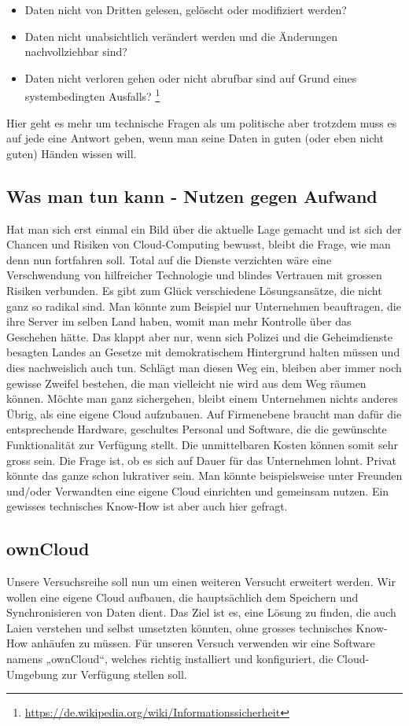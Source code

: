 \begin{itemize}
\item Daten nicht von Dritten gelesen, gelöscht oder modifiziert werden?
\item Daten nicht unabsichtlich verändert werden und die Änderungen nachvollziehbar sind?
\item Daten nicht verloren gehen oder nicht abrufbar sind auf Grund eines systembedingten Ausfalls?
\footnote{\url{https://de.wikipedia.org/wiki/Informationssicherheit}}
\end{itemize}

Hier geht es mehr um technische Fragen als um politische aber trotzdem muss es auf jede eine Antwort geben, wenn man seine Daten in guten (oder eben nicht guten) Händen wissen will.

\subsection{Was man tun kann - Nutzen gegen Aufwand}
Hat man sich erst einmal ein Bild über die aktuelle Lage gemacht und ist sich der Chancen und Risiken von Cloud-Computing bewusst, bleibt die Frage, wie man denn nun fortfahren soll. Total auf die Dienste verzichten wäre eine Verschwendung von hilfreicher Technologie und blindes Vertrauen mit grossen Risiken verbunden. Es gibt zum Glück verschiedene Lösungsansätze, die nicht ganz so radikal sind. Man könnte zum Beispiel nur Unternehmen beauftragen, die ihre Server im selben Land haben, womit man mehr Kontrolle über das Geschehen hätte. Das klappt aber nur, wenn sich Polizei und die Geheimdienste besagten Landes an Gesetze mit demokratischem Hintergrund halten müssen und dies nachweislich auch tun. Schlägt man diesen Weg ein, bleiben aber immer noch gewisse Zweifel bestehen, die man vielleicht nie wird aus dem Weg räumen können. Möchte man ganz sichergehen, bleibt einem Unternehmen nichts anderes Übrig, als eine eigene Cloud aufzubauen. Auf Firmenebene braucht man dafür die entsprechende Hardware, geschultes Personal und  Software, die die gewünschte Funktionalität zur Verfügung stellt. Die unmittelbaren Kosten können somit sehr gross sein. Die Frage ist, ob es sich auf Dauer für das Unternehmen lohnt. Privat könnte das ganze schon lukrativer sein. Man könnte beispielsweise unter Freunden und/oder Verwandten eine eigene Cloud einrichten und gemeinsam nutzen. Ein gewisses technisches Know-How ist aber auch hier gefragt. 

\subsection{ownCloud}
Unsere Versuchsreihe soll nun um einen weiteren Versucht erweitert werden. Wir wollen eine eigene Cloud aufbauen, die hauptsächlich dem Speichern und Synchronisieren von Daten dient. Das Ziel ist es, eine Lösung zu finden, die auch Laien verstehen und selbst umsetzten könnten, ohne grosses technisches Know-How anhäufen zu müssen. Für unseren Versuch verwenden wir eine Software namens „ownCloud“, welches richtig installiert und konfiguriert, die Cloud-Umgebung zur Verfügung stellen soll. 

